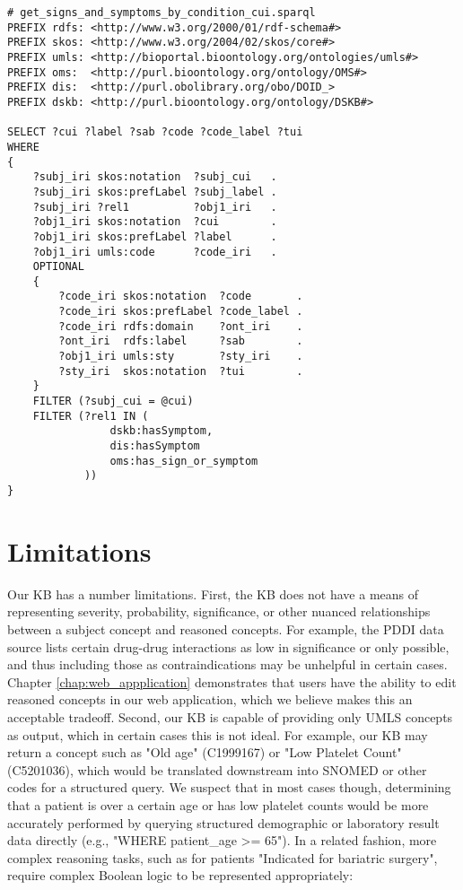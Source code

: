 \documentclass[../main.tex]{subfiles}
\begin{document}
\def\baselinestretch{1.0}    
\begin{lstlisting}
# get_signs_and_symptoms_by_condition_cui.sparql
PREFIX rdfs: <http://www.w3.org/2000/01/rdf-schema#>
PREFIX skos: <http://www.w3.org/2004/02/skos/core#>
PREFIX umls: <http://bioportal.bioontology.org/ontologies/umls#>
PREFIX oms:  <http://purl.bioontology.org/ontology/OMS#>
PREFIX dis:  <http://purl.obolibrary.org/obo/DOID_>
PREFIX dskb: <http://purl.bioontology.org/ontology/DSKB#>

SELECT ?cui ?label ?sab ?code ?code_label ?tui
WHERE 
{
    ?subj_iri skos:notation  ?subj_cui   .
    ?subj_iri skos:prefLabel ?subj_label .
    ?subj_iri ?rel1          ?obj1_iri   .
    ?obj1_iri skos:notation  ?cui        .
    ?obj1_iri skos:prefLabel ?label      .
    ?obj1_iri umls:code      ?code_iri   .
    OPTIONAL
    {
        ?code_iri skos:notation  ?code       .
        ?code_iri skos:prefLabel ?code_label .
        ?code_iri rdfs:domain    ?ont_iri    .
        ?ont_iri  rdfs:label     ?sab        .
        ?obj1_iri umls:sty       ?sty_iri    .
        ?sty_iri  skos:notation  ?tui        .
    }
    FILTER (?subj_cui = @cui) 
    FILTER (?rel1 IN (
                dskb:hasSymptom,
                dis:hasSymptom
                oms:has_sign_or_symptom
            ))
}
\end{lstlisting}
\def\baselinestretch{1.5}    

\section{Limitations}

Our KB has a number limitations. First, the KB does not have a means of representing severity, probability, significance, or other nuanced relationships between a subject concept and reasoned concepts. For example, the PDDI data source lists certain drug-drug interactions as low in significance or only possible, and thus including those as contraindications may be unhelpful in certain cases. Chapter \ref{chap:web_appplication} demonstrates that users have the ability to edit reasoned concepts in our web application, which we believe makes this an acceptable tradeoff. Second, our KB is capable of providing only UMLS concepts as output, which in certain cases this is not ideal. For example, our KB may return a concept such as "Old age" (C1999167) or "Low Platelet Count" (C5201036), which would be translated downstream into SNOMED or other codes for a structured query. We suspect that in most cases though, determining that a patient is over a certain age or has low platelet counts would be more accurately performed by querying structured demographic or laboratory result data directly (e.g., "WHERE patient\_age >= 65"). In a related fashion, more complex reasoning tasks, such as for patients "Indicated for bariatric surgery", require complex Boolean logic to be represented appropriately:
\end{document}
